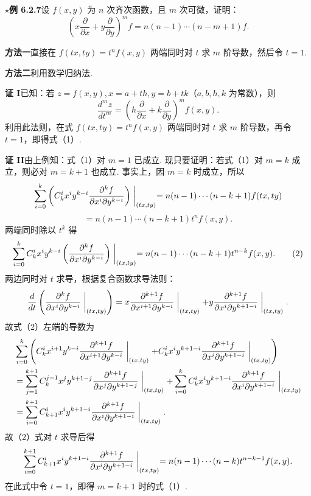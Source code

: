 \documentclass[UTF8,12pt,a4paper,fontset=fandol]{ctexart}
\begin{document}
\noindent\textbf{\ensuremath{\star}例 6.2.7}\quad 设 $f(x,y)$ 为 $n$ 次齐次函数，且 $m$ 次可微，证明：
\[
  \left(x\frac{\partial}{\partial x}+y\frac{\partial}{\partial y}\right)^m f
  =n(n-1)\cdots(n-m+1)f. \tag{1}
\]

\textbf{方法一}\quad 直接在 $f(tx,ty)=t^nf(x,y)$ 两端同时对 $t$ 求 $m$ 阶导数，然后令 $t=1$.

\textbf{方法二}\quad 利用数学归纳法.

\noindent\textbf{证 I}\quad 已知：若 $z=f(x,y),x=a+th,y=b+tk$（$a,b,h,k$ 为常数），则
\[
  \frac{d^mz}{dt^m}=\left(h\frac{\partial}{\partial x}+k\frac{\partial}{\partial y}\right)^m f(x,y).
\]
利用此法则，在式 $f(tx,ty)=t^nf(x,y)$ 两端同时对 $t$ 求 $m$ 阶导数，再令 $t=1$，即得式（1）.

\noindent\textbf{证 II}\quad 由上例知：式（1）对 $m=1$ 已成立. 现只要证明：若式（1）对 $m=k$ 成立，则必对 $m=k+1$ 也成立. 事实上，因 $m=k$ 时成立，所以
\[
  \sum_{i=0}^k\left(C_k^i x^i y^{k-i}\frac{\partial^k f}{\partial x^i\partial y^{k-i}}\right)\biggm|_{(tx,ty)}
  =n(n-1)\cdots(n-k+1)f(tx,ty)
\]
\[
  =n(n-1)\cdots(n-k+1)t^nf(x,y).
\]
两端同时除以 $t^k$ 得
\[
  \sum_{i=0}^k C_k^i x^i y^{k-i}
  \left(\frac{\partial^k f}{\partial x^i\partial y^{k-i}}\right)\biggm|_{(tx,ty)}
  =n(n-1)\cdots(n-k+1)t^{n-k}f(x,y). \tag{2}
\]
两边同时对 $t$ 求导，根据复合函数求导法则：
\[
  \frac{d}{dt}\left(\frac{\partial^k f}{\partial x^i\partial y^{k-i}}\biggm|_{(tx,ty)}\right)
  =x\frac{\partial^{k+1}f}{\partial x^{i+1}\partial y^{k-i}}\biggm|_{(tx,ty)}
  +y\frac{\partial^{k+1}f}{\partial x^i\partial y^{k+1-i}}\biggm|_{(tx,ty)}.
\]
故式（2）左端的导数为
\[
\begin{aligned}
  &\sum_{i=0}^k\left(
  C_k^i x^{i+1}y^{k-i}\frac{\partial^{k+1}f}{\partial x^{i+1}\partial y^{k-i}}\biggm|_{(tx,ty)}
  +C_k^i x^iy^{k+1-i}\frac{\partial^{k+1}f}{\partial x^i\partial y^{k+1-i}}\biggm|_{(tx,ty)}
  \right)\\
  &=\sum_{j=1}^{k+1}C_k^{j-1}x^jy^{k+1-j}\frac{\partial^{k+1}f}{\partial x^j\partial y^{k+1-j}}\biggm|_{(tx,ty)}
  +\sum_{i=0}^k C_k^i x^iy^{k+1-i}\frac{\partial^{k+1}f}{\partial x^i\partial y^{k+1-i}}\biggm|_{(tx,ty)}\\
  &=\sum_{i=0}^{k+1}C_{k+1}^i x^iy^{k+1-i}
  \frac{\partial^{k+1}f}{\partial x^i\partial y^{k+1-i}}\biggm|_{(tx,ty)}.
\end{aligned}
\]
故（2）式对 $t$ 求导后得
\[
  \sum_{i=0}^{k+1}C_{k+1}^i x^iy^{k+1-i}
  \frac{\partial^{k+1}f}{\partial x^i\partial y^{k+1-i}}\biggm|_{(tx,ty)}
  =n(n-1)\cdots(n-k)t^{n-k-1}f(x,y).
\]
在此式中令 $t=1$，即得 $m=k+1$ 时的式（1）.
\end{document}
